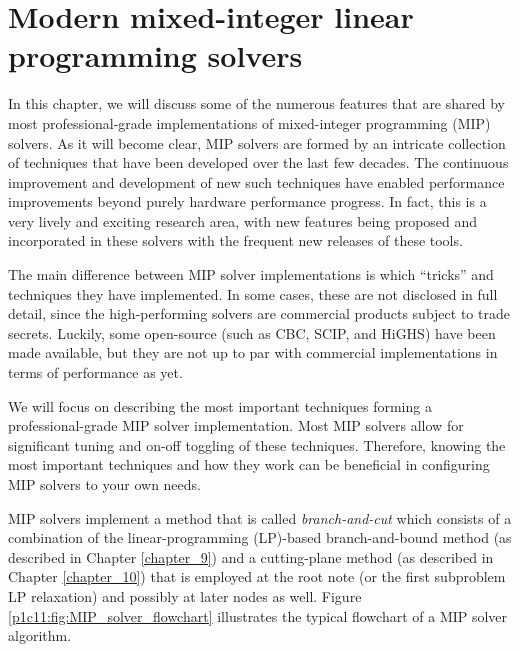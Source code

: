 \section{Modern mixed-integer linear programming solvers}

In this chapter, we will discuss some of the numerous features that are shared by most professional-grade implementations of mixed-integer programming (MIP) solvers. As it will become clear, MIP solvers are formed by an intricate collection of techniques that have been developed over the last few decades. The continuous improvement and development of new such techniques have enabled performance improvements beyond purely hardware performance progress. In fact, this is a very lively and exciting research area, with new features being proposed and incorporated in these solvers with the frequent new releases of these tools.

The main difference between MIP solver implementations is which ``tricks'' and techniques they have implemented. In some cases, these are not disclosed in full detail, since the high-performing solvers are commercial products subject to trade secrets. Luckily, some open-source (such as CBC, SCIP, and HiGHS) have been made available, but they are not up to par with commercial implementations in terms of performance as yet.

We will focus on describing the most important techniques forming a professional-grade MIP solver implementation. Most MIP solvers allow for significant tuning and on-off toggling of these techniques. Therefore, knowing the most important techniques and how they work can be beneficial in configuring MIP solvers to your own needs.

MIP solvers implement a method that is called \emph{branch-and-cut} which consists of a combination of the linear-programming (LP)-based branch-and-bound method (as described in Chapter \ref{chapter_9}) and a cutting-plane method (as described in Chapter \ref{chapter_10}) that is employed at the root note (or the first subproblem LP relaxation) and possibly at later nodes as well. Figure \ref{p1c11:fig:MIP_solver_flowchart} illustrates the typical flowchart of a MIP solver algorithm.

